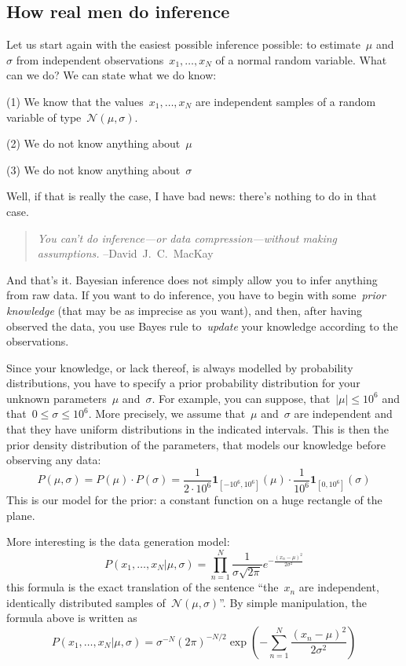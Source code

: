 \subsection{How real men do inference}

Let us start again with the easiest possible inference possible: to
estimate~$\mu$ and~$\sigma$ from independent observations~$x_1,\ldots,x_N$ of
a normal random variable.  What can we do?  We can state what we do know:

(1) We know that the values~$x_1,\ldots,x_N$ are independent samples of a
random variable of type~$\mathcal{N}(\mu,\sigma)$.

(2) We do not know anything about~$\mu$

(3) We do not know anything about~$\sigma$

Well, if that is really the case, I have bad news: there's nothing to do in
that case.

\begin{quote}
	\emph{You can't do inference---or data compression---without
	making assumptions.}\newline
	--David~J.~C.~MacKay
\end{quote}

And that's it.  Bayesian inference does not simply allow you to infer
anything from raw data.  If you want to do inference, you have to begin with
some~\emph{prior knowledge} (that may be as imprecise as you want), and then,
after having observed the data, you use Bayes rule to~\emph{update} your
knowledge according to the observations.

Since your knowledge, or lack thereof, is always modelled by probability
distributions, you have to specify a prior probability
distribution for your unknown parameters~$\mu$ and~$\sigma$.  For example,
you can suppose, that~$|\mu|\le10^6$ and
that~$0\le\sigma\le10^6$.  More precisely, we assume that~$\mu$ and~$\sigma$
are independent and that they have uniform distributions in the indicated
intervals.  This is then the prior density distribution of the parameters, that
models our knowledge before observing any data:
$$
P(\mu,\sigma)=P(\mu)\cdot P(\sigma)=
\frac{1}{2\cdot10^6}\mathbf{1}_{\left[-10^6,10^6\right]}(\mu)
\cdot
\frac{1}{10^6}\mathbf{1}_{\left[0,10^6\right]}(\sigma)
$$
This is our model for the prior: a constant function on a huge rectangle of
the plane.

More interesting is the data generation model:
$$
P(x_1,\ldots,x_N|\mu,\sigma)=
\prod_{n=1}^N \frac{1}{\sigma\sqrt{2\pi}}e^{-\frac{(x_n-\mu)^2}{2\sigma^2}}
$$
this formula is the exact translation of the sentence ``the~$x_n$ are
independent, identically distributed samples of~$\mathcal{N}(\mu,\sigma)$''.
By simple manipulation, the formula above is written as
$$
P(x_1,\ldots,x_N|\mu,\sigma)=
\sigma^{-N}(2\pi)^{-N/2}\exp\left(-\sum_{n=1}^N\frac{(x_n-\mu)^2}{2\sigma^2}\right)
$$

